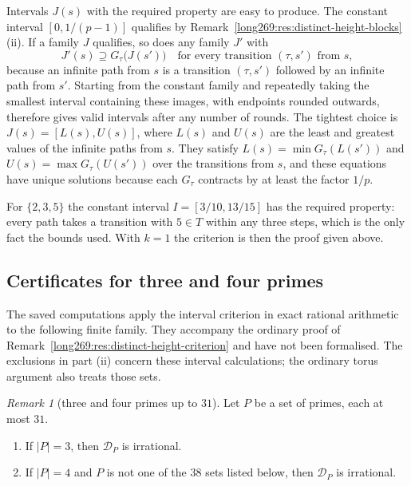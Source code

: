 \documentclass[11pt]{article}
\theoremstyle{remark}
\newtheorem{recordremark}[theorem]{Remark}
\renewenvironment{remark}[1][]{\begin{recordremark}[#1]}{\end{recordremark}}
\theoremstyle{plain}
\begin{document}
Intervals $J(s)$ with the required property are easy to produce.  The
constant interval $[0,1/(p-1)]$ qualifies by
Remark~\ref{long269:res:distinct-height-blocks}(ii).  If a family $J$
qualifies, so does any family $J'$ with
\[
 J'(s)\supseteq G_\tau\bigl(J(s')\bigr)\quad\text{for every transition }(\tau,s')\text{ from }s,
\]
because an infinite path from $s$ is a transition $(\tau,s')$ followed by an
infinite path from $s'$.  Starting from the constant family and repeatedly
taking the smallest interval containing these images, with endpoints rounded
outwards, therefore gives valid intervals after any number of rounds.  The
tightest choice is $J(s)=[L(s),U(s)]$, where $L(s)$ and $U(s)$ are the least
and greatest values of the infinite paths from $s$.  They satisfy
$L(s)=\min G_\tau(L(s'))$ and $U(s)=\max G_\tau(U(s'))$ over the transitions
from $s$, and these equations have unique solutions because each $G_\tau$
contracts by at least the factor $1/p$.

For $\{2,3,5\}$ the constant interval $I=[3/10,13/15]$ has the required
property: every path takes a transition with $5\in T$ within any three
steps, which is the only fact the bounds used.  With $k=1$ the criterion is
then the proof given above.

\subsection{Certificates for three and four primes}
\label{long269:sec:distinct-certificates}

The saved computations apply the interval criterion in exact rational
arithmetic to the following finite family. They accompany the ordinary
proof of Remark~\ref{long269:res:distinct-height-criterion} and have not
been formalised. The exclusions in part (ii) concern these interval
calculations; the ordinary torus argument also treats those sets.


\begin{remark}[three and four primes up to $31$]\label{long269:res:distinct-height-sets}
Let $P$ be a set of primes, each at most $31$.
\begin{enumerate}[label=\textup{(\roman*)}]
\item If $|P|=3$, then $\mathcal D_P$ is irrational.
\item If $|P|=4$ and $P$ is not one of the $38$ sets listed below, then
$\mathcal D_P$ is irrational.
\end{enumerate}
\end{remark}
\end{document}
